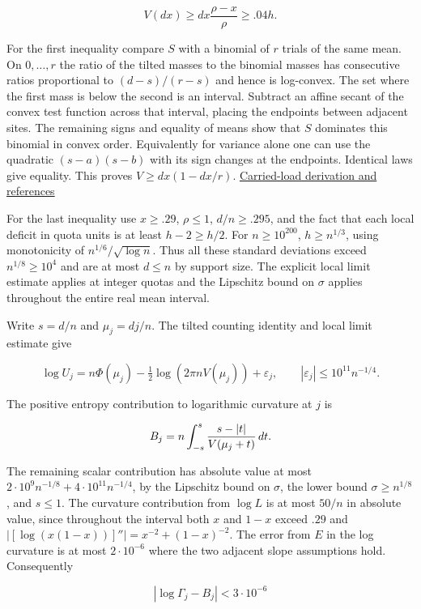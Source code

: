 \documentclass[11pt]{article}
\begin{document}
\[
V(d x)\ge d x\frac{\rho-x}{\rho}\ge .04 h.
\]

For the first inequality compare $S$ with a binomial of $r$ trials of the same mean. On $0,\ldots,r$ the ratio of the tilted masses to the binomial masses has consecutive ratios proportional to $(d-s)/(r-s)$ and hence is log-convex. The set where the first mass is below the second is an interval. Subtract an affine secant of the convex test function across that interval, placing the endpoints between adjacent sites. The remaining signs and equality of means show that $S$ dominates this binomial in convex order. Equivalently for variance alone one can use the quadratic $(s-a)(s-b)$ with its sign changes at the endpoints. Identical laws give equality. This proves $V\ge dx(1-dx/r)$. \href{https://github.com/ProgramComputer/open-math-research/blob/8a0a986e6baeed69b30de189e75c02fd2c8cb955/topics/balanced-arrays/engset-curvature/carried-load.md}{Carried-load derivation and references}

For the last inequality use $x\ge .29$, $\rho\le1$, $d/n\ge .295$,
and the fact that each local deficit in quota units is at least $h-2\ge h/2$.
For $n\ge10^{200}$, $h\ge n^{1/3}$, using monotonicity of
$n^{1/6}/\sqrt{\log n}$. Thus all these standard deviations exceed
$n^{1/8}\ge10^4$ and are at most $d\le n$ by support size.
The explicit local limit estimate applies at integer quotas and the
Lipschitz bound on $\sigma$ applies throughout the entire real mean interval.

Write $s=d/n$ and $\mu_j=dj/n$. The tilted counting identity and local
limit estimate give

\[
\log U_j=n\Phi(\mu_j)-\tfrac12\log(2\pi n V(\mu_j))+\varepsilon_j,
\qquad |\varepsilon_j|\le10^{11}n^{-1/4}.
\]

The positive entropy contribution to logarithmic curvature at $j$ is

\[
B_j=n\int_{-s}^s\frac{s-|t|}{V(\mu_j+t)}\thinspace{}dt .
\]

The remaining scalar contribution has absolute value at most
$2\cdot10^9 n^{-1/8}+4\cdot10^{11}n^{-1/4}$, by the Lipschitz bound
on $\sigma$, the lower bound $\sigma\ge n^{1/8}$, and $s\le1$.
The curvature contribution from $\log L$ is at most $50/n$ in
absolute value, since throughout the interval both $x$ and $1-x$
exceed $.29$ and
$|[\log(x(1-x))]''|=x^{-2}+(1-x)^{-2}$.
The error from $E$ in the log curvature is at most $2\cdot 10^{-6}$
where the two adjacent slope assumptions hold.
Consequently

\[
|\log\Gamma_j-B_j|<3\cdot10^{-6}
\]
\end{document}
